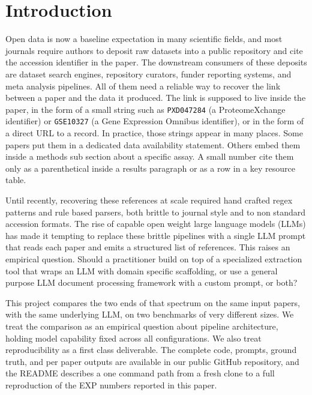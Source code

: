 \documentclass[sigconf,nonacm]{acmart}
\begin{document}
\maketitle

\section{Introduction}
\label{sec:intro}

Open data is now a baseline expectation in many scientific fields, and most journals require authors to deposit raw datasets into a public repository and cite the accession identifier in the paper. The downstream consumers of these deposits are dataset search engines, repository curators, funder reporting systems, and meta analysis pipelines. All of them need a reliable way to recover the link between a paper and the data it produced. The link is supposed to live inside the paper, in the form of a small string such as \texttt{PXD047284} (a ProteomeXchange identifier) or \texttt{GSE10327} (a Gene Expression Omnibus identifier), or in the form of a direct URL to a record. In practice, those strings appear in many places. Some papers put them in a dedicated data availability statement. Others embed them inside a methods sub section about a specific assay. A small number cite them only as a parenthetical inside a results paragraph or as a row in a key resource table.

Until recently, recovering these references at scale required hand crafted regex patterns and rule based parsers, both brittle to journal style and to non standard accession formats. The rise of capable open weight large language models (LLMs) has made it tempting to replace these brittle pipelines with a single LLM prompt that reads each paper and emits a structured list of references. This raises an empirical question. Should a practitioner build on top of a specialized extraction tool that wraps an LLM with domain specific scaffolding, or use a general purpose LLM document processing framework with a custom prompt, or both?

This project compares the two ends of that spectrum on the same input papers, with the same underlying LLM, on two benchmarks of very different sizes. We treat the comparison as an empirical question about pipeline architecture, holding model capability fixed across all configurations. We also treat reproducibility as a first class deliverable. The complete code, prompts, ground truth, and per paper outputs are available in our public GitHub repository, and the README describes a one command path from a fresh clone to a full reproduction of the EXP numbers reported in this paper.
\end{document}
